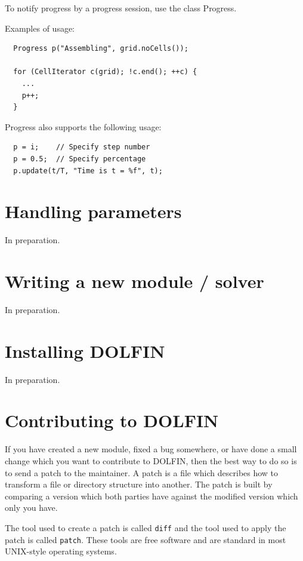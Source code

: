 \documentclass[12pt]{article}
\begin{document}
To notify progress by a progress session, use the class
Progress.

Examples of usage:

\begin{verbatim}
  Progress p("Assembling", grid.noCells());
  
  for (CellIterator c(grid); !c.end(); ++c) {
    ...
    p++;
  }
\end{verbatim}

Progress also supports the following usage:

\begin{verbatim}
  p = i;    // Specify step number
  p = 0.5;  // Specify percentage
  p.update(t/T, "Time is t = %f", t);
\end{verbatim}

\cleardoublepage
\section{Handling parameters}

In preparation.

\cleardoublepage
\section{Writing a new module / solver}

In preparation.

\cleardoublepage
\section{Installing DOLFIN}

In preparation.

\cleardoublepage
\section{Contributing to DOLFIN}

If you have created a new module, fixed a bug somewhere, or have done
a small change which you want to contribute to DOLFIN, then
the best way to do so is to send a patch to the maintainer. A patch
is a file which describes how to transform a file or directory structure
into another. The patch is built by comparing a version which both parties
have against the modified version which only you have.

The tool used to create a patch is called \texttt{diff} and the tool
used to apply the patch is called \texttt{patch}. These tools are free
software and are standard in most UNIX-style operating systems.
\end{document}
